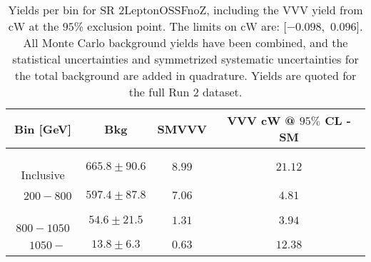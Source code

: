 \begin{table}[!htbp]
    \small
    \center
    \begin{tabular}{c||c|c|c}
    Bin [GeV] & Bkg & SMVVV & \pbox{20cm}{VVV \\ cW @ $95\%$ CL - SM \\ }\\
    \hline
    \pbox{20cm}{ ~ \\Inclusive\\ } & $665.8 \pm 90.6$ & $8.99$ & $21.12$\\
    \hline
    \pbox{20cm}{ ~ \\$200-800$\\ } & $597.4 \pm 87.8$ & $7.06$ & $4.81$\\
    \hline
    \pbox{20cm}{ ~ \\$800-1050$\\ } & $54.6 \pm 21.5$ & $1.31$ & $3.94$\\
    \hline
    \pbox{20cm}{ ~ \\$1050-$\\ } & $13.8 \pm 6.3$ & $0.63$ & $12.38$\\
\end{tabular}
    \caption{Yields per bin for SR 2LeptonOSSFnoZ, including the VVV yield from cW at the $95$\% exclusion point. The limits on cW are: [$-0.098$,~$0.096$]. All Monte Carlo background yields have been combined, and the statistical uncertainties and symmetrized systematic uncertainties for the total background are added in quadrature. Yields are quoted for the full Run 2 dataset.}
    \label{tab:2LeptonOSSFnoZ$binssignal}
\end{table}
